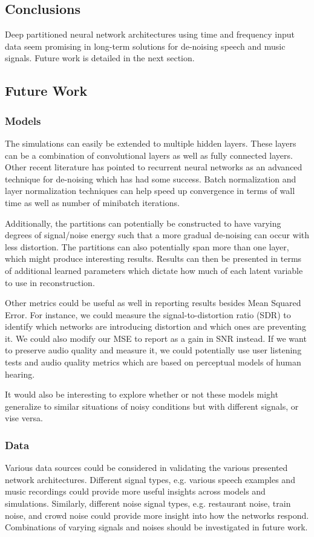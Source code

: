 \subsection{Conclusions}
Deep partitioned neural network architectures using time and frequency input data seem promising in long-term solutions for de-noising speech and music signals. Future work is detailed in the next section.

\subsection{Future Work}
\subsubsection{Models}
The simulations can easily be extended to multiple hidden layers. These layers can be a combination of convolutional layers as well as fully connected layers. \cite{kayserdenoising} Other recent literature has pointed to recurrent neural networks as an advanced technique for de-noising which has had some success. \cite{graves2014towards} Batch normalization and layer normalization techniques can help speed up convergence in terms of wall time as well as number of minibatch iterations. \cite{2016arXiv160706450L}

Additionally, the partitions can potentially be constructed to have varying degrees of signal/noise energy such that a more gradual de-noising can occur with less distortion. The partitions can also potentially span more than one layer, which might produce interesting results. Results can then be presented in terms of additional learned parameters which dictate how much of each latent variable to use in reconstruction.

Other metrics could be useful as well in reporting results besides Mean Squared Error. For instance, we could measure the signal-to-distortion ratio (SDR) to identify which networks are introducing distortion and which ones are preventing it. We could also modify our MSE to report as a gain in SNR instead. If we want to preserve audio quality and measure it, we could potentially use user listening tests and audio quality metrics which are based on perceptual models of human hearing.

It would also be interesting to explore whether or not these models might generalize to similar situations of noisy conditions but with different signals, or vise versa.

\subsubsection{Data}
Various data sources could be considered in validating the various presented network architectures. Different signal types, e.g. various speech examples and music recordings could provide more useful insights across models and simulations. Similarly, different noise signal types, e.g. restaurant noise, train noise, and crowd noise could provide more insight into how the networks respond. Combinations of varying signals and noises should be investigated in future work.
